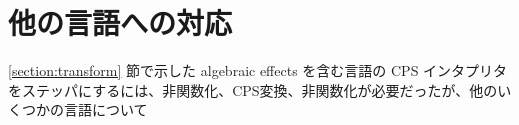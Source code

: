 \section{他の言語への対応}
\label{section:languages}

\ref{section:transform} 節で示した algebraic effects を含む言語の CPS インタプリタをステッパにするには、非関数化、CPS変換、非関数化が必要だったが、他のいくつかの言語について
